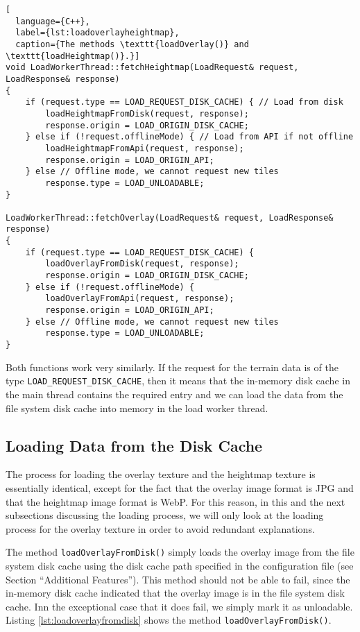 \begin{lstlisting}[
  language={C++},
  label={lst:loadoverlayheightmap},
  caption={The methods \texttt{loadOverlay()} and \texttt{loadHeightmap()}.}]
void LoadWorkerThread::fetchHeightmap(LoadRequest& request, LoadResponse& response)
{
    if (request.type == LOAD_REQUEST_DISK_CACHE) { // Load from disk
        loadHeightmapFromDisk(request, response);
        response.origin = LOAD_ORIGIN_DISK_CACHE;
    } else if (!request.offlineMode) { // Load from API if not offline
        loadHeightmapFromApi(request, response);
        response.origin = LOAD_ORIGIN_API;
    } else // Offline mode, we cannot request new tiles
        response.type = LOAD_UNLOADABLE;
}

LoadWorkerThread::fetchOverlay(LoadRequest& request, LoadResponse& response)
{
    if (request.type == LOAD_REQUEST_DISK_CACHE) {
        loadOverlayFromDisk(request, response);
        response.origin = LOAD_ORIGIN_DISK_CACHE;
    } else if (!request.offlineMode) {
        loadOverlayFromApi(request, response);
        response.origin = LOAD_ORIGIN_API;
    } else // Offline mode, we cannot request new tiles
        response.type = LOAD_UNLOADABLE;
}
\end{lstlisting}

Both functions work very similarly. If the request 
for the terrain data is of the type \texttt{LOAD\_REQUEST\_DISK\_CACHE},
then it means that the in-memory disk cache in the main thread 
contains the required entry and we can load the data from the file system disk cache 
into memory in the load worker thread.

\subsection{Loading Data from the Disk Cache}
The process for loading the overlay texture and the 
heightmap texture is essentially identical, except 
for the fact that the overlay image format is JPG 
and that the heightmap image format is WebP.
For this reason, in this and the next subsections 
discussing the loading process, we will only look 
at the loading process for the overlay texture 
in order to avoid redundant explanations.

The method \texttt{loadOverlayFromDisk()} simply 
loads the overlay image from the file system disk cache using 
the disk cache path specified in the configuration file (see Section ``Additional Features'').
This method should not be able to fail, 
since the in-memory disk cache indicated 
that the overlay image is in the file system disk cache.
Inn the exceptional case that it does fail, 
we simply mark it as unloadable. 
Listing \ref{lst:loadoverlayfromdisk} shows the method \texttt{loadOverlayFromDisk()}.

